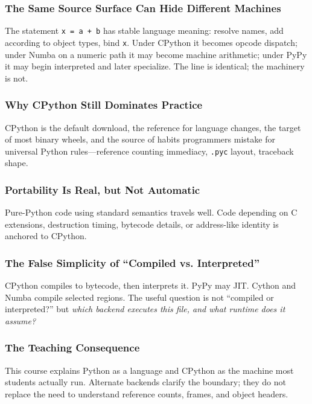\documentclass[a4paper,twoside]{report}
\begin{document}
\subsubsection{The Same Source Surface Can Hide Different Machines}

The statement \texttt{x = a + b} has stable language meaning: resolve names, add according to object types, bind \texttt{x}. Under CPython it becomes opcode dispatch; under Numba on a numeric path it may become machine arithmetic; under PyPy it may begin interpreted and later specialize. The line is identical; the machinery is not.

\subsubsection{Why CPython Still Dominates Practice}

CPython is the default download, the reference for language changes, the target of most binary wheels, and the source of habits programmers mistake for universal Python rules---reference counting immediacy, \texttt{.pyc} layout, traceback shape.

\subsubsection{Portability Is Real, but Not Automatic}

Pure-Python code using standard semantics travels well. Code depending on C extensions, destruction timing, bytecode details, or address-like identity is anchored to CPython.

\subsubsection{The False Simplicity of “Compiled vs. Interpreted”}

CPython compiles to bytecode, then interprets it. PyPy may JIT. Cython and Numba compile selected regions. The useful question is not ``compiled or interpreted?'' but \emph{which backend executes this file, and what runtime does it assume?}

\subsubsection{The Teaching Consequence}

This course explains Python as a language and CPython as the machine most students actually run. Alternate backends clarify the boundary; they do not replace the need to understand reference counts, frames, and object headers.
\end{document}
